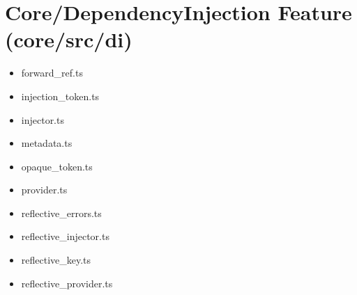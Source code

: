 \section{Core/DependencyInjection Feature (core/src/di)}





\begin{itemize}
  \item forward\_ref.ts
  \item injection\_token.ts
  \item injector.ts
  \item metadata.ts
  \item opaque\_token.ts
  \item provider.ts
  \item reflective\_errors.ts
  \item reflective\_injector.ts
  \item reflective\_key.ts
  \item reflective\_provider.ts
\end{itemize}
















